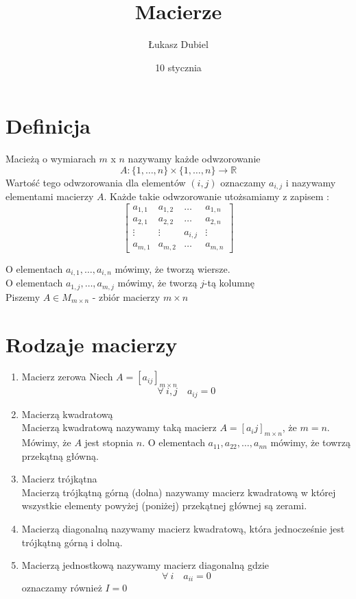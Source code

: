 \documentclass[11pt]{article}
\author{Łukasz Dubiel}
\title{Macierze}
\date{10 stycznia}
\begin{document}
\maketitle
\section{Definicja}
Macieżą o wymiarach $m$ x $n$ nazywamy każde odwzorowanie 
$$ A:\{1,\ldots,n\} \times \{1,\ldots,n\} \to \mathbb{R}$$
Wartość tego odwzorowania dla elementów $(i,j)$ oznaczamy $a_{i,j}$ i nazywamy elementami macierzy $A$. Każde takie odwzorowanie utożsamiamy z zapisem :
$$\begin{bmatrix} 
a_{1,1} & a_{1,2} & \ldots & a_{1,n} \\
a_{2,1} & a_{2,2} & \ldots & a_{2,n} \\
\vdots & \vdots & a_{i,j} & \vdots\\
a_{m,1} & a_{m,2} & \ldots & a_{m,n} 
\end{bmatrix}$$

O elementach $a_{i,1},\ldots,a_{i,n}$ mówimy, że tworzą wiersze.\\
O elementach $a_{1,j},\ldots,a_{m,j}$ mówimy, że tworzą $j$-tą kolumnę \\
Piszemy $A \in M_{m \times n}$ - zbiór macierzy $m \times n$
\section{Rodzaje macierzy}
\begin{enumerate}
\item{Macierz zerowa Niech $A = [a_{ij}]_{m \times n}$ $$ \forall\ i,j \quad  a_{ij} = 0 $$}
\item{Macierzą kwadratową\\
Macierzą kwadratową nazywamy taką macierz $ A = [a_ij]_{m \times n} $, że $m = n$. Mówimy, że $A$ jest stopnia $n$. O elementach $a_{11},a_{22},\ldots,a_{nn}$ mówimy, że towrzą przekątną główną.}
\item{Macierz trójkątna \\
Macierzą trójkątną górną (dolna) nazywamy macierz kwadratową w której wszystkie elementy powyżej (poniżej) przekątnej głównej są zerami.}
\item{Macierzą diagonalną nazywamy macierz kwadratową, która jednocześnie jest trójkątną górną i dolną.}
\item{Macierzą jednostkową nazywamy macierz diagonalną gdzie $$ \forall\ i \quad a_{ii} = 0 $$ oznaczamy również $ I = 0 $}
\end{enumerate}
\end{document}
